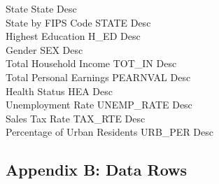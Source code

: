 \documentclass[
  12pt,
]{article}
\begin{document}
State \textbar{} State \textbar{} Desc \textbar{}\\
State by FIPS Code \textbar{} STATE \textbar{} Desc \textbar{}\\
Highest Education \textbar{} H\_ED \textbar{} Desc \textbar{}\\
Gender \textbar{} SEX \textbar{} Desc \textbar{}\\
Total Household Income \textbar{} TOT\_IN \textbar{} Desc \textbar{}\\
Total Personal Earnings \textbar{} PEARNVAL \textbar{} Desc \textbar{}\\
Health Status \textbar{} HEA \textbar{} Desc \textbar{}\\
Unemployment Rate \textbar{} UNEMP\_RATE \textbar{} Desc \textbar{}\\
Sales Tax Rate \textbar{} TAX\_RTE \textbar{} Desc \textbar{}\\
Percentage of Urban Residents \textbar{} URB\_PER \textbar{} Desc
\textbar{}

\newpage

\hypertarget{appendix-b-data-rows}{%
\subsection{Appendix B: Data Rows}\label{appendix-b-data-rows}}
\end{document}
